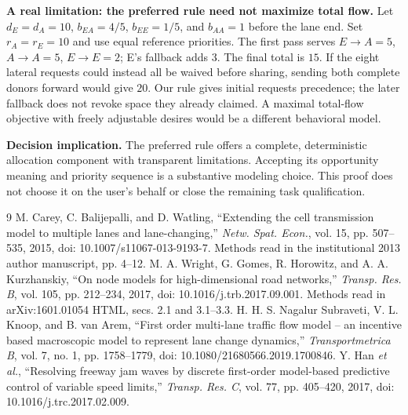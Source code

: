 \documentclass[10pt,a4paper]{article}
\begin{document}
\textbf{A real limitation: the preferred rule need not maximize total flow.}
Let $d_E=d_A=10$, $b_{EA}=4/5$, $b_{EE}=1/5$, and $b_{AA}=1$ before the
lane end. Set $r_A=r_E=10$ and use equal reference priorities. The first
pass serves $E\to A=5$, $A\to A=5$, $E\to E=2$; E's fallback adds 3.
The final total is $15$. If the eight lateral requests could instead all
be waived before sharing, sending both complete donors forward would give
$20$. Our rule gives initial requests precedence; the later fallback does
not revoke space they already claimed. A maximal total-flow objective with
freely adjustable desires would be a different behavioral model.

\textbf{Decision implication.} The preferred rule offers a complete,
deterministic allocation component with transparent limitations. Accepting
its opportunity meaning and priority sequence is a substantive modeling
choice. This proof does not choose it on the user's behalf or close the
remaining task qualification.

\begin{thebibliography}{9}\setlength{\itemsep}{0pt}
 M. Carey, C. Balijepalli, and D. Watling, ``Extending the cell
transmission model to multiple lanes and lane-changing,'' \emph{Netw. Spat.
Econ.}, vol. 15, pp. 507--535, 2015, doi: 10.1007/s11067-013-9193-7.
Methods read in the institutional 2013 author manuscript, pp. 4--12.
 M. A. Wright, G. Gomes, R. Horowitz, and A. A. Kurzhanskiy,
``On node models for high-dimensional road networks,'' \emph{Transp. Res. B},
vol. 105, pp. 212--234, 2017, doi: 10.1016/j.trb.2017.09.001.
Methods read in arXiv:1601.01054 HTML, secs. 2.1 and 3.1--3.3.
 H. H. S. Nagalur Subraveti, V. L. Knoop, and B. van Arem,
``First order multi-lane traffic flow model -- an incentive based macroscopic
model to represent lane change dynamics,'' \emph{Transportmetrica B},
vol. 7, no. 1, pp. 1758--1779, doi: 10.1080/21680566.2019.1700846.
 Y. Han \emph{et al.}, ``Resolving freeway jam waves by discrete
first-order model-based predictive control of variable speed limits,''
\emph{Transp. Res. C}, vol. 77, pp. 405--420, 2017,
doi: 10.1016/j.trc.2017.02.009.
\end{thebibliography}
\end{document}
